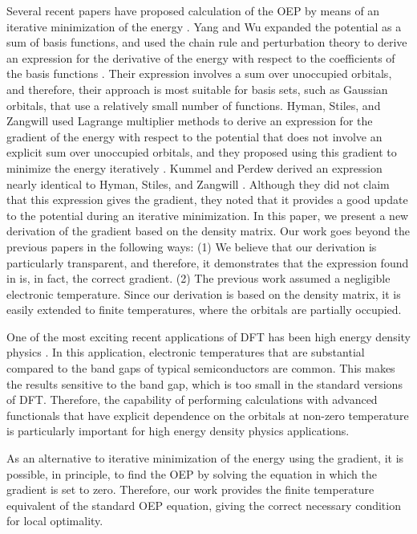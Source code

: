 \documentclass[12pt]{iopart}
\begin{document}
Several recent papers have proposed calculation of the OEP by means of an iterative minimization
of the energy \cite{YangWu:02,HymanStilesZangwill:00,KummelPerdew:03,KummelPerdewPRB:03}.
Yang and Wu expanded the potential as a sum of basis functions, and used the chain rule
and perturbation theory to derive an expression for the derivative of the energy with
respect to the coefficients of the basis functions \cite{YangWu:02}.  Their expression
involves a sum over unoccupied orbitals, and therefore, their approach is most suitable
for basis sets, such as Gaussian orbitals, that use a relatively small number of functions.
Hyman, Stiles, and Zangwill used Lagrange multiplier methods to derive an expression for
the gradient of the energy with respect to the potential that does not involve an explicit
sum over unoccupied orbitals, and they proposed using this gradient to minimize the
energy iteratively \cite{HymanStilesZangwill:00}.  Kummel and Perdew derived an expression
nearly identical to Hyman, Stiles, and Zangwill \cite{KummelPerdew:03,KummelPerdewPRB:03}.
Although they did not claim that this expression gives the gradient, they noted that it
provides a good update to the potential during an iterative minimization.  In this paper,
we present a new derivation of the gradient based on the density matrix.  Our work goes
beyond the previous papers in the following ways: (1) We believe that our derivation
is particularly transparent, and therefore, it demonstrates that the expression found
in \cite{HymanStilesZangwill:00,KummelPerdew:03, KummelPerdewPRB:03} is, in fact,
the correct gradient.  (2)  The previous work assumed a negligible electronic temperature.
Since our derivation is based on the density matrix, it is easily extended to finite
temperatures, where the orbitals are partially occupied.

One of the most exciting recent applications of DFT has been high energy density
physics \cite{Desjarlais:02,Desjarlais:03}.  In this application, electronic temperatures
that are substantial
compared to the band gaps of typical semiconductors are common.  This makes
the results sensitive to the band gap, which is too small in the standard
versions of DFT. Therefore, the capability of performing calculations with
advanced functionals that have explicit dependence on the orbitals at
non-zero temperature is particularly important for high energy density physics
applications.

As an alternative to iterative minimization of the energy using the gradient,
it is possible, in principle, to find the OEP by solving the equation in
which the gradient is set to zero.  Therefore, our work provides the finite
temperature equivalent of the standard OEP equation, giving the correct
necessary condition for local optimality.
\end{document}
